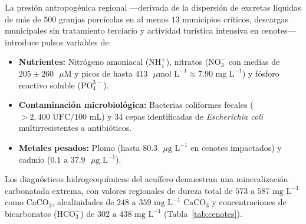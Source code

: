 \documentclass[11pt,letterpaper]{article}
\begin{document}
La presión antropogénica regional ---derivada de la dispersión de excretas líquidas de más de $500$ granjas porcícolas en al menos $13$ municipios críticos, descargas municipales sin tratamiento terciario y actividad turística intensiva en cenotes--- introduce pulsos variables de:
\begin{itemize}[leftmargin=1.5em]
    \item \textbf{Nutrientes:} Nitrógeno amoniacal ($\text{NH}_4^+$), nitratos ($\text{NO}_3^-$ con medias de $205 \pm 260\text{ }\mu\text{M}$ y picos de hasta $413\text{ }\mu\text{mol L}^{-1} \approx 7.90\text{ mg L}^{-1}$) y fósforo reactivo soluble ($\text{PO}_4^{3-}$).
    \item \textbf{Contaminación microbiológica:} Bacterias coliformes fecales ($> 2,400\text{ UFC}/100\text{ mL}$) y $34$ cepas identificadas de \textit{Escherichia coli} multirresistentes a antibióticos.
    \item \textbf{Metales pesados:} Plomo (hasta $80.3\text{ }\mu\text{g L}^{-1}$ en cenotes impactados) y cadmio ($0.1\text{ a }37.9\text{ }\mu\text{g L}^{-1}$).
\end{itemize}

Los diagnósticos hidrogeoquímicos del acuífero demuestran una mineralización carbonatada extrema, con valores regionales de dureza total de $573\text{ a }587\text{ mg L}^{-1}$ como $\text{CaCO}_3$, alcalinidades de $248\text{ a }359\text{ mg L}^{-1}\text{ CaCO}_3$ y concentraciones de bicarbonatos ($\text{HCO}_3^-$) de $302\text{ a }438\text{ mg L}^{-1}$ (Tabla~\ref{tab:cenotes}).
\end{document}
